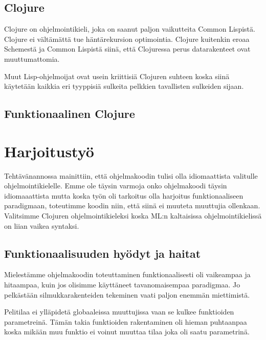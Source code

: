 \documentclass[12pt]{article}
\begin{document}
\subsection{Clojure}
Clojure on ohjelmointikieli, joka on saanut paljon vaikutteita Common Lispistä. Clojure ei vältämättä tue häntärekursion optimointia. Clojure kuitenkin eroaa Schemestä ja Common Lispistä siinä, että Clojuressa perus datarakenteet ovat muuttumattomia. 

Muut Lisp-ohjelmoijat ovat usein kriittisiä Clojuren suhteen koska siinä käytetään kaikkia eri tyyppisiä sulkeita pelkkien tavallisten sulkeiden sijaan.
\subsection{Funktionaalinen Clojure}

\section{Harjoitustyö}
Tehtävänannossa mainittiin, että ohjelmakoodin tulisi olla idiomaattista valitulle ohjelmointikielelle.
Emme ole täysin varmoja onko ohjelmakoodi täysin idiomaaattista mutta koska työn oli tarkoitus olla harjoitus funktionaaliseen paradigmaan,
toteutimme koodin niin, että siinä ei muuteta muuttujia ollenkaan.
Valitsimme Clojuren ohjelmointikieleksi koska ML:n kaltaisissa ohjelmointikielissä on liian vaikea syntaksi.

\subsection{Funktionaalisuuden hyödyt ja haitat}
Mielestämme ohjelmakoodin toteuttaminen funktionaalisesti oli vaikeampaa ja hitaampaa, kuin jos olisimme käyttäneet tavanomaisempaa
paradigmaa. Jo pelkästään silmukkarakenteiden tekeminen vaati paljon enemmän miettimistä. 


Pelitilaa ei ylläpidetä globaaleissa muuttujissa vaan se kulkee funktioiden parametreinä.
Tämän takia funktioiden rakentaminen oli hieman puhtaanpaa koska mikään muu funktio ei voinut muuttaa tilaa joka oli saatu parametrinä.






\end{document}
